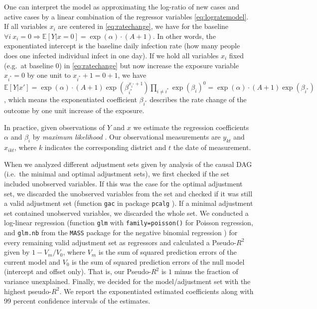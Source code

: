 \documentclass[]{elsarticle} %
\begin{document}
One can interpret the model as approximating the log-ratio of new cases and active cases by a linear combination of the regressor variables \eqref{eq:logratemodel}. If all variables \(x_i\) are centered in \eqref{eq:ratechange}, we have for the baseline \(\forall i\ x_i=0 \Rightarrow \mathbb{E}[Y|x=0]=\exp(\alpha)\cdot (A+1)\). In other words, the exponentiated intercept is the baseline daily infection rate (how many people does one infected individual infect in one day). If we hold all variables \(x_i\) fixed (e.g.~at baseline 0) in \eqref{eq:ratechange} but now increase the exposure variable \(x_{i^{\ast}}=0\) by one unit to \(x_{i^{\ast}}+1=0+1\), we have \(\mathbb{E}[Y|x']=\exp(\alpha)\cdot(A+1)\exp(\beta_{i^{\ast}}^{x_{i^{\ast}}+1})\prod_{i\neq i^{\ast}}\exp(\beta_i)^0=\exp(\alpha)\cdot(A+1)\exp(\beta_{i^{\ast}})\), which means the exponentiated coefficient \(\beta_{i^{\ast}}\) describes the rate change of the outcome by one unit increase of the exposure.

In practice, given observations of \(Y\) and \(x\) we estimate the regression coefficients \(\alpha\) and \(\beta_i\) by \emph{maximum likelihood} \citep{maxlikelihood}. Our observational measurements are \(y_{kt}\) and \(x_{ikt}\), where \(k\) indicates the corresponding district and \(t\) the date of measurement.

When we analyzed different adjustment sets given by analysis of the causal DAG (i.e.~the minimal and optimal adjustment sets), we first checked if the set included unobserved variables. If this was the case for the optimal adjustment set, we discarded the unobserved variables from the set and checked if it was still a valid adjustment set (function \texttt{gac} in package \texttt{pcalg} \citep{perkovi2015complete}). If a minimal adjustment set contained unobserved variables, we discarded the whole set. We conducted a log-linear regression (function \texttt{glm} with \texttt{family=poisson()} for Poisson regression, and \texttt{glm.nb} from the \texttt{MASS} package for the negative binomial regression \citep{mass}) for every remaining valid adjustment set as regressors and calculated a Pseudo-\(R^2\) given by \(1-V_m/V_0\), where \(V_m\) is the sum of squared prediction errors of the current model and \(V_0\) is the sum of squared prediction errors of the null model (intercept and offset only). That is, our Pseudo-\(R^2\) is \(1\) minus the fraction of variance unexplained. Finally, we decided for the model/adjustment set with the highest pseudo-\(R^2\). We report the exponentiated estimated coefficients along with 99 percent confidence intervals of the estimates.
\end{document}
